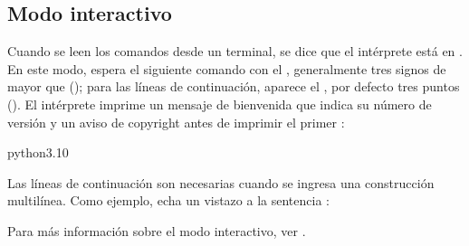 \documentclass[a5paper,10pt,spanish]{sphinxmanual}
\begin{document}
\subsection{Modo interactivo}
\label{\detokenize{tutorial/interpreter:interactive-mode}}\label{\detokenize{tutorial/interpreter:tut-interactive}}
\sphinxAtStartPar
Cuando se leen los comandos desde un terminal, se dice que el intérprete está en . En este modo, espera el siguiente comando con el , generalmente tres signos de mayor que (\sphinxcode{\sphinxupquote{>>>}}); para las líneas de continuación, aparece el , por defecto tres puntos (). El intérprete imprime un mensaje de bienvenida que indica su número de versión y un aviso de copyright antes de imprimir el primer :

\begin{sphinxVerbatim}[commandchars=\\\{\}]
 python3.10
\PYGZgt{}\PYGZgt{}
\end{sphinxVerbatim}

\sphinxAtStartPar
Las líneas de continuación son necesarias cuando se ingresa una construcción multilínea. Como ejemplo, echa un vistazo a la sentencia :

\begin{sphinxVerbatim}[commandchars=\\\{\}]
  
 
    
\end{sphinxVerbatim}

\sphinxAtStartPar
Para más información sobre el modo interactivo, ver {\hyperref[\detokenize{tutorial/appendix:tut-interac}]{}}.
\end{document}

